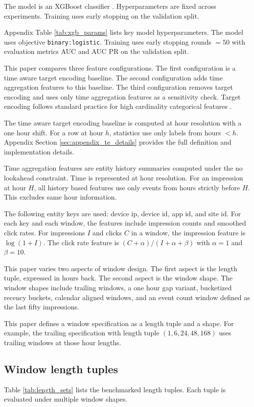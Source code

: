 The model is an XGBoost classifier \citep{chen2016xgboost}.
Hyperparameters are fixed across experiments.
Training uses early stopping on the validation split.

Appendix Table \ref{tab:xgb_params} lists key model hyperparameters.
The model uses objective \texttt{binary:logistic}.
Training uses early stopping rounds $=50$ with evaluation metrics AUC and AUC PR on the validation split.

This paper compares three feature configurations.
The first configuration is a time aware target encoding baseline.
The second configuration adds time aggregation features to this baseline.
The third configuration removes target encoding and uses only time aggregation features as a sensitivity check.
Target encoding follows standard practice for high cardinality categorical features \citep{micci2001preprocessing}.

The time aware target encoding baseline is computed at hour resolution with a one hour shift.
For a row at hour $h$, statistics use only labels from hours $< h$.
Appendix Section \ref{sec:appendix_te_details} provides the full definition and implementation details.

Time aggregation features are entity history summaries computed under the no lookahead constraint.
Time is represented at hour resolution.
For an impression at hour $H$, all history based features use only events from hours strictly before $H$.
This excludes same hour information.

The following entity keys are used: device ip, device id, app id, and site id.
For each key and each window, the features include impression counts and smoothed click rates.
For impressions $I$ and clicks $C$ in a window, the impression feature is $\log(1+I)$.
The click rate feature is $(C + \alpha) / (I + \alpha + \beta)$ with $\alpha=1$ and $\beta=10$.

This paper varies two aspects of window design.
The first aspect is the length tuple, expressed in hours back.
The second aspect is the window shape.
The window shapes include trailing windows, a one hour gap variant, bucketized recency buckets, calendar aligned windows, and an event count window defined as the last fifty impressions.

This paper defines a window specification as a length tuple and a shape.
For example, the trailing specification with length tuple $(1, 6, 24, 48, 168)$ uses trailing windows at those hour lengths.

\subsection{Window length tuples}
Table \ref{tab:length_sets} lists the benchmarked length tuples.
Each tuple is evaluated under multiple window shapes.


